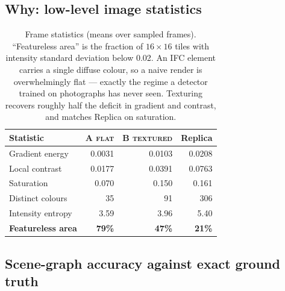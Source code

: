 \documentclass[11pt,a4paper]{article}
\begin{document}
\subsection{Why: low-level image statistics}

\begin{table}[h]
\centering
\small
\begin{tabular}{@{}lrrr@{}}
\toprule
\textbf{Statistic} & \textbf{A \textsc{flat}} & \textbf{B \textsc{textured}} &
\textbf{Replica} \\
\midrule
Gradient energy        & 0.0031 & 0.0103 & 0.0208 \\
Local contrast         & 0.0177 & 0.0391 & 0.0763 \\
Saturation             & 0.070  & 0.150  & 0.161 \\
Distinct colours       & 35     & 91     & 306 \\
Intensity entropy      & 3.59   & 3.96   & 5.40 \\
\textbf{Featureless area} & \textbf{79\%} & \textbf{47\%} & \textbf{21\%} \\
\bottomrule
\end{tabular}
\caption{Frame statistics (means over sampled frames). ``Featureless area'' is
the fraction of $16\times16$ tiles with intensity standard deviation below
0.02. An IFC element carries a single diffuse colour, so a naive render is
overwhelmingly flat --- exactly the regime a detector trained on photographs has
never seen. Texturing recovers roughly half the deficit in gradient and
contrast, and matches Replica on saturation.}
\label{tab:stats}
\end{table}

\subsection{Scene-graph accuracy against exact ground truth}
\end{document}
